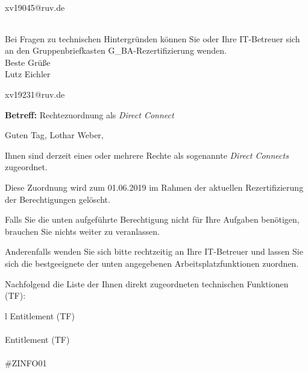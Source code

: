 \documentclass[a4paper,landscape,12pt]{letter}
\begin{document}
\begin{letter}{xv19045@ruv.de\hfill \break}
\begin{tiny}
\begin{longtable}{|p{35mm}|p{15mm}|p{25mm}|p{10mm}|p{40mm}|p{50mm}|p{50mm}|}
\hline
		\end{longtable}
		\end{tiny}
	
\begin{minipage}{\textwidth}
			Bei Fragen zu technischen Hintergründen können Sie 
			oder Ihre IT-Betreuer sich an den Gruppenbriefkasten 
			G\_BA-Rezertifizierung
			wenden.\\
			\linebreak
			Beste Grüße\\
			Lutz Eichler
	\end{minipage}
	\end{letter}
	
\begin{letter}{xv19231@ruv.de\hfill \break}
\begin{normalsize}
	\opening{\textbf{Betreff:} Rechtezuordnung als \emph{Direct Connect}}
	\begin{normalsize} \hfill
	\end{normalsize}

	\begin{normalsize}
		Guten Tag, 
	Lothar Weber, \hfill \break
	\end{normalsize}
	\end{normalsize}
	
\begin{normalsize}
	Ihnen sind derzeit eines oder mehrere Rechte als sogenannte \emph{Direct Connects} zugeordnet.
	
	Diese Zuordnung wird zum 01.06.2019 im Rahmen der aktuellen Rezertifizierung der Berechtigungen gelöscht.
	
	Falls Sie die unten aufgeführte Berechtigung nicht für Ihre Aufgaben benötigen, 
	brauchen Sie nichts weiter zu veranlassen.
	
	Anderenfalls wenden Sie sich bitte rechtzeitig an Ihre IT-Betreuer 
	und lassen Sie sich die bestgeeignete der unten angegebenen Arbeitsplatzfunktionen zuordnen.
	\end{normalsize}
	
\begin{normalsize}
	Nachfolgend die Liste der Ihnen direkt zugeordneten technischen Funktionen (TF):

	\begin{longtable}{l}
		Entitlement (TF) \\ \hline
		\endfirsthead
		\\\hline
		Entitlement (TF) \\ \hline
		\endhead %
		\multicolumn{1}{r@{}}{Fortsetzung \ldots}\\
		\endfoot
		\hline
		\endlastfoot
	\#ZINFO01\\
	\end{longtable}
	\end{normalsize}
	

\end{letter}
\end{document}
